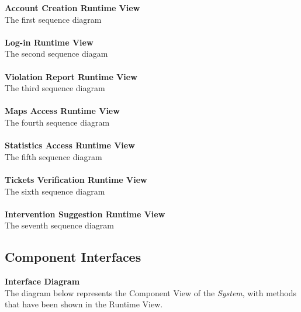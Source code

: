 \documentclass{article}
\begin{document}
	{\bf Account Creation Runtime View} \\
	The first sequence diagram
	\\ \\
	{\bf Log-in Runtime View} \\
	The second sequence diagam
	\\ \\
	{\bf Violation Report Runtime View} \\
	The third sequence diagram
	\\ \\
	{\bf Maps Access Runtime View} \\
	The fourth sequence diagram
	\\ \\
	{\bf Statistics Access Runtime View} \\
	The fifth sequence diagram
	\\ \\
	{\bf Tickets Verification Runtime View} \\
	The sixth sequence diagram
	\\ \\ 
	{\bf Intervention Suggestion Runtime View} \\
	The seventh sequence diagram
	
	\subsection{Component Interfaces}
	{\bf Interface Diagram} \\
	The diagram below represents the Component View of the {\it System}, with methods that have been shown in the Runtime View. 

	
\end{document}
